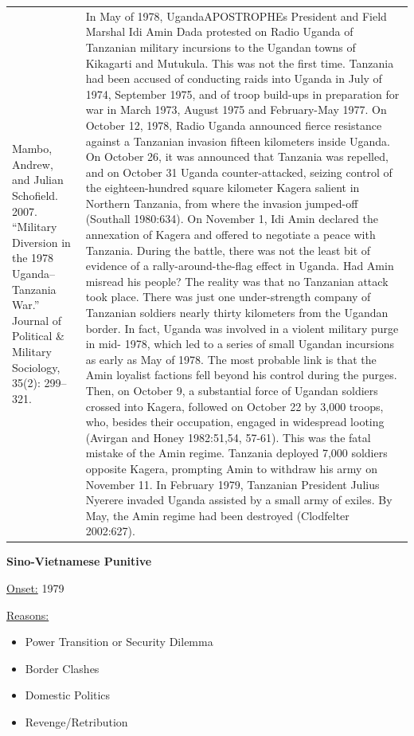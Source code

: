 {\begin{longtable}{p{}p{}}
\\
Mambo, Andrew, and Julian Schofield. 2007. “Military Diversion in the 1978 Uganda–Tanzania War.” Journal of Political \& Military Sociology, 35(2): 299–321. & In May of 1978, UgandaAPOSTROPHEs President and Field Marshal Idi Amin Dada protested on Radio Uganda of Tanzanian military incursions to the Ugandan towns of Kikagarti and Mutukula. This was not the first time. Tanzania had been accused of conducting raids into Uganda in July of 1974, September 1975, and of troop build-ups in preparation for war in March 1973, August 1975 and February-May 1977. On October 12, 1978, Radio Uganda announced fierce resistance against a Tanzanian invasion fifteen kilometers inside Uganda. On October 26, it was announced that Tanzania was repelled, and on October 31 Uganda counter-attacked, seizing control of the eighteen-hundred square kilometer Kagera salient in Northern Tanzania, from where the invasion jumped-off (Southall 1980:634). On November 1, Idi Amin declared the annexation of Kagera and offered to negotiate a peace with Tanzania. During the battle, there was not the least bit of evidence of a rally-around-the-flag effect in Uganda. Had Amin misread his people? The reality was that no Tanzanian attack took place. There was just one under-strength company of Tanzanian soldiers nearly thirty kilometers from the Ugandan border. In fact, Uganda was involved in a violent military purge in mid- 1978, which led to a series of small Ugandan incursions as early as May of 1978. The most probable link is that the Amin loyalist factions fell beyond his control during the purges. Then, on October 9, a substantial force of Ugandan soldiers crossed into Kagera, followed on October 22 by 3,000 troops, who, besides their occupation, engaged in widespread looting (Avirgan and Honey 1982:51,54, 57-61). This was the fatal mistake of the Amin regime. Tanzania deployed 7,000 soldiers opposite Kagera, prompting Amin to withdraw his army on November 11. In February 1979, Tanzanian President Julius Nyerere invaded Uganda assisted by a small army of exiles. By May, the Amin regime had been destroyed (Clodfelter 2002:627).
\\
\end{longtable}}
\clearpage
         \textbf{Sino-Vietnamese Punitive} 

          \underline{Onset:} 1979         

\underline{Reasons:}
\begin{itemize}
\item Power Transition or Security Dilemma
\item Border Clashes
\item Domestic Politics
\item Revenge/Retribution
\end{itemize}

